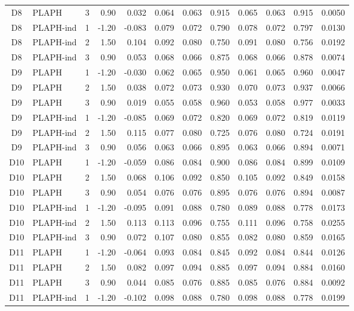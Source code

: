 \begin{longtable}{cllrrrrrrrrr}
D8 & PLAPH & 3 & 0.90 & 0.032 & 0.064 & 0.063 & 0.915 & 0.065 & 0.063 & 0.915 & 0.0050 \\
D8 & PLAPH-ind & 1 & -1.20 & -0.083 & 0.079 & 0.072 & 0.790 & 0.078 & 0.072 & 0.797 & 0.0130 \\
D8 & PLAPH-ind & 2 & 1.50 & 0.104 & 0.092 & 0.080 & 0.750 & 0.091 & 0.080 & 0.756 & 0.0192 \\
D8 & PLAPH-ind & 3 & 0.90 & 0.053 & 0.068 & 0.066 & 0.875 & 0.068 & 0.066 & 0.878 & 0.0074 \\
D9 & PLAPH & 1 & -1.20 & -0.030 & 0.062 & 0.065 & 0.950 & 0.061 & 0.065 & 0.960 & 0.0047 \\
D9 & PLAPH & 2 & 1.50 & 0.038 & 0.072 & 0.073 & 0.930 & 0.070 & 0.073 & 0.937 & 0.0066 \\
D9 & PLAPH & 3 & 0.90 & 0.019 & 0.055 & 0.058 & 0.960 & 0.053 & 0.058 & 0.977 & 0.0033 \\
D9 & PLAPH-ind & 1 & -1.20 & -0.085 & 0.069 & 0.072 & 0.820 & 0.069 & 0.072 & 0.819 & 0.0119 \\
D9 & PLAPH-ind & 2 & 1.50 & 0.115 & 0.077 & 0.080 & 0.725 & 0.076 & 0.080 & 0.724 & 0.0191 \\
D9 & PLAPH-ind & 3 & 0.90 & 0.056 & 0.063 & 0.066 & 0.895 & 0.063 & 0.066 & 0.894 & 0.0071 \\
D10 & PLAPH & 1 & -1.20 & -0.059 & 0.086 & 0.084 & 0.900 & 0.086 & 0.084 & 0.899 & 0.0109 \\
D10 & PLAPH & 2 & 1.50 & 0.068 & 0.106 & 0.092 & 0.850 & 0.105 & 0.092 & 0.849 & 0.0158 \\
D10 & PLAPH & 3 & 0.90 & 0.054 & 0.076 & 0.076 & 0.895 & 0.076 & 0.076 & 0.894 & 0.0087 \\
D10 & PLAPH-ind & 1 & -1.20 & -0.095 & 0.091 & 0.088 & 0.780 & 0.089 & 0.088 & 0.778 & 0.0173 \\
D10 & PLAPH-ind & 2 & 1.50 & 0.113 & 0.113 & 0.096 & 0.755 & 0.111 & 0.096 & 0.758 & 0.0255 \\
D10 & PLAPH-ind & 3 & 0.90 & 0.072 & 0.107 & 0.080 & 0.855 & 0.082 & 0.080 & 0.859 & 0.0165 \\
D11 & PLAPH & 1 & -1.20 & -0.064 & 0.093 & 0.084 & 0.845 & 0.092 & 0.084 & 0.844 & 0.0126 \\
D11 & PLAPH & 2 & 1.50 & 0.082 & 0.097 & 0.094 & 0.885 & 0.097 & 0.094 & 0.884 & 0.0160 \\
D11 & PLAPH & 3 & 0.90 & 0.044 & 0.085 & 0.076 & 0.885 & 0.085 & 0.076 & 0.884 & 0.0092 \\
D11 & PLAPH-ind & 1 & -1.20 & -0.102 & 0.098 & 0.088 & 0.780 & 0.098 & 0.088 & 0.778 & 0.0199 \\

\end{longtable}
